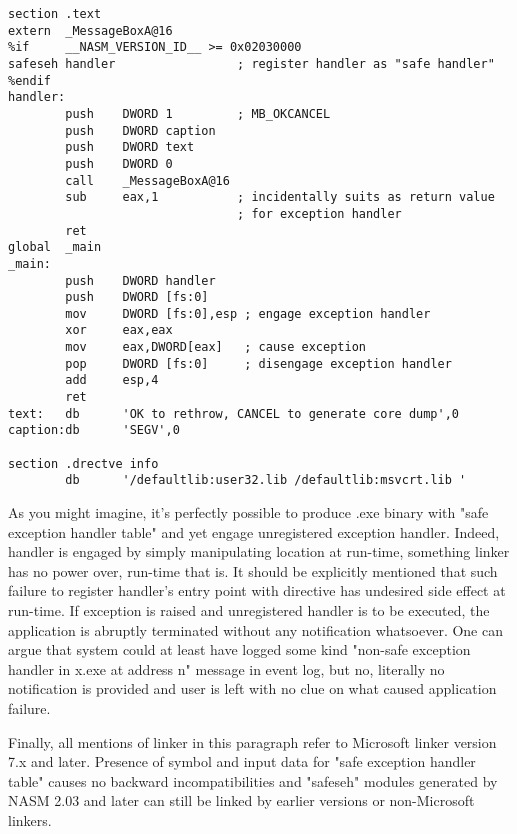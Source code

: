 \begin{lstlisting}
section .text
extern  _MessageBoxA@16
%if     __NASM_VERSION_ID__ >= 0x02030000
safeseh handler                 ; register handler as "safe handler"
%endif
handler:
        push    DWORD 1         ; MB_OKCANCEL
        push    DWORD caption
        push    DWORD text
        push    DWORD 0
        call    _MessageBoxA@16
        sub     eax,1           ; incidentally suits as return value
                                ; for exception handler
        ret
global  _main
_main:
        push    DWORD handler
        push    DWORD [fs:0]
        mov     DWORD [fs:0],esp ; engage exception handler
        xor     eax,eax
        mov     eax,DWORD[eax]   ; cause exception
        pop     DWORD [fs:0]     ; disengage exception handler
        add     esp,4
        ret
text:   db      'OK to rethrow, CANCEL to generate core dump',0
caption:db      'SEGV',0

section .drectve info
        db      '/defaultlib:user32.lib /defaultlib:msvcrt.lib '
\end{lstlisting}

As you might imagine, it's perfectly possible to produce .exe binary
with "safe exception handler table" and yet engage unregistered
exception handler. Indeed, handler is engaged by simply manipulating
\code{[fs:0]} location at run-time, something linker has no power over,
run-time that is. It should be explicitly mentioned that such failure
to register handler's entry point with  directive has
undesired side effect at run-time. If exception is raised and
unregistered handler is to be executed, the application is abruptly
terminated without any notification whatsoever. One can argue that
system could  at least have logged some kind "non-safe exception
handler in x.exe at address n" message in event log, but no, literally
no notification is provided and user is left with no clue on what
caused application failure.

Finally, all mentions of linker in this paragraph refer to Microsoft
linker version 7.x and later. Presence of  symbol and input
data for "safe exception handler table" causes no backward
incompatibilities and "safeseh" modules generated by NASM 2.03 and
later can still be linked by earlier versions or non-Microsoft linkers.
